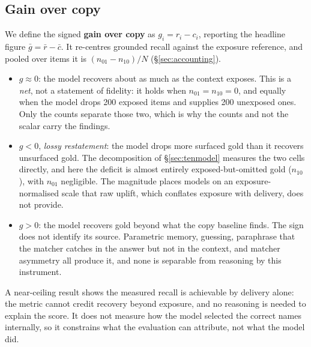 \documentclass[10pt,twocolumn]{article}
\begin{document}
\subsection{Gain over copy}
We define the signed \textbf{gain over copy} as $g_i=r_i-c_i$, reporting the headline figure $\bar g=\bar r-\bar c$. It re-centres grounded recall against the exposure reference, and pooled over items it is $(n_{01}-n_{10})/N$ (\S\ref{sec:accounting}).
\begin{itemize}[topsep=2pt,itemsep=1pt,leftmargin=1.4em]
\item $g\approx0$: the model recovers about as much as the context exposes. This is a \emph{net}, not a statement of fidelity: it holds when $n_{01}=n_{10}=0$, and equally when the model drops 200 exposed items and supplies 200 unexposed ones. Only the counts separate those two, which is why the counts and not the scalar carry the findings.
\item $g<0$, \emph{lossy restatement}: the model drops more surfaced gold than it recovers unsurfaced gold. The decomposition of \S\ref{sec:tenmodel} measures the two cells directly, and here the deficit is almost entirely exposed-but-omitted gold ($n_{10}$), with $n_{01}$ negligible. The magnitude places models on an exposure-normalised scale that raw uplift, which conflates exposure with delivery, does not provide.
\item $g>0$: the model recovers gold beyond what the copy baseline finds. The sign does not identify its source. Parametric memory, guessing, paraphrase that the matcher catches in the answer but not in the context, and matcher asymmetry all produce it, and none is separable from reasoning by this instrument.
\end{itemize}
A near-ceiling result shows the measured recall is achievable by delivery alone: the metric cannot credit recovery beyond exposure, and no reasoning is needed to explain the score. It does not measure how the model selected the correct names internally, so it constrains what the evaluation can attribute, not what the model did.
\end{document}
